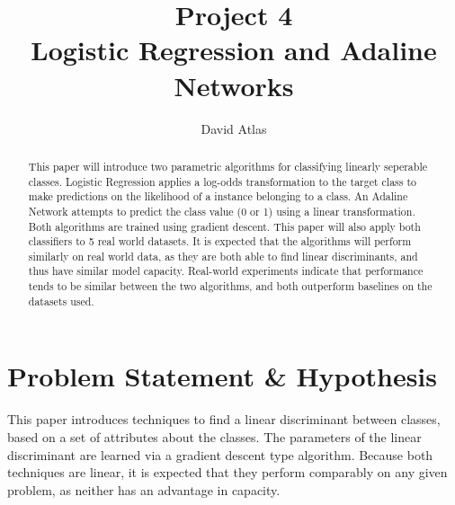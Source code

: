\documentclass{amsart}
\title{Project 4 \\ Logistic Regression and Adaline Networks}
\author{David Atlas}
\begin{document}
    \begin{abstract}
    This paper will introduce two parametric algorithms for
    classifying linearly seperable classes. Logistic Regression
    applies a log-odds transformation to the target class to make predictions
    on the likelihood of a instance belonging to a class.
    An Adaline Network attempts to predict the class value (0 or 1) using
    a linear transformation. Both algorithms are trained using gradient
    descent. This paper will also apply both classifiers to 5 real
    world datasets. It is expected that the algorithms will perform
    similarly on real world data, as they are both able to find linear
    discriminants, and thus have similar model capacity. Real-world experiments
        indicate that performance tends to be similar between the two algorithms,
        and both outperform baselines on the datasets used.

    \end{abstract}

    \maketitle

    \section{Problem Statement \& Hypothesis}
    This paper introduces techniques to find a linear discriminant
    between classes, based on a set of attributes about the classes.
    The parameters of the linear discriminant are learned via a
    gradient descent type algorithm. Because both techniques are linear,
    it is expected that they perform comparably on any given problem, as neither has an
    advantage in capacity.
\end{document}
